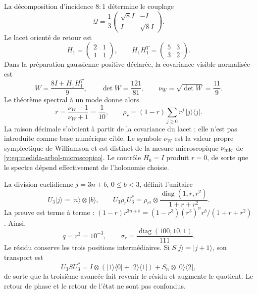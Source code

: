 La décomposition d’incidence $8{:}1$ détermine le couplage
\[
 \mathcal Q=\frac13
 \begin{pmatrix}\sqrt8 I&-I\\ I&\sqrt8 I\end{pmatrix}.
\]
Le lacet orienté de retour est
\[
 H_1=\begin{pmatrix}2&1\\1&1\end{pmatrix},\qquad
 H_1H_1^T=\begin{pmatrix}5&3\\3&2\end{pmatrix}.
\]
Dans la préparation gaussienne positive déclarée, la covariance visible
normalisée est
\begin{equation}
 W=\frac{8I+H_1H_1^T}{9},\qquad
 \det W=\frac{121}{81},\qquad
 \nu_W=\sqrt{\det W}=\frac{11}{9}.
 \label{v:eq:williamson-decimal}
\end{equation}
Le théorème spectral à un mode donne alors
\begin{equation}
 r=\frac{\nu_W-1}{\nu_W+1}=\frac1{10},\qquad
 \rho_r=(1-r)\sum_{j\ge0}r^j\,|j\rangle\langle j|.
 \label{v:eq:estado-geometrico-decimal}
\end{equation}
La raison décimale s’obtient à partir de la covariance du lacet ; elle n’est pas introduite comme
base numérique cible. Le symbole $\nu_W$ est la valeur propre symplectique de
Williamson et est distinct de la mesure microscopique $\nu_{\rm mic}$ de
\eqref{v:eq:medida-arbol-microscopico}. Le contrôle $H_0=I$ produit $r=0$,
de sorte que le spectre dépend effectivement de l’holonomie choisie.

La division euclidienne $j=3n+b$, $0\le b<3$, définit l’unitaire
\begin{equation}
 U_3|j\rangle=|n\rangle\otimes|b\rangle,\qquad
 U_3\rho_rU_3^*=\rho_{r^3}\otimes
 \frac{\operatorname{diag}(1,r,r^2)}{1+r+r^2}.
 \label{v:eq:agrupamiento-tritico-espectral}
\end{equation}
La preuve est terme à terme :
$(1-r)r^{3n+b}=(1-r^3)(r^3)^n r^b/(1+r+r^2)$.
Ainsi,
\begin{equation}
 q=r^3=10^{-3},\qquad
 \sigma_r=\frac{\operatorname{diag}(100,10,1)}{111}.
 \label{v:eq:razon-milenaria-y-residuo}
\end{equation}
Le résidu conserve les trois positions intermédiaires. Si $S|j\rangle=|j+1\rangle$,
son transport est
\[
 U_3SU_3^*=I\otimes(|1\rangle\langle0|+|2\rangle\langle1|)
 +S_n\otimes|0\rangle\langle2|,
\]
de sorte que la troisième avancée fait revenir le résidu et augmente le quotient. Le retour
de phase et le retour de l’état ne sont pas confondus.

